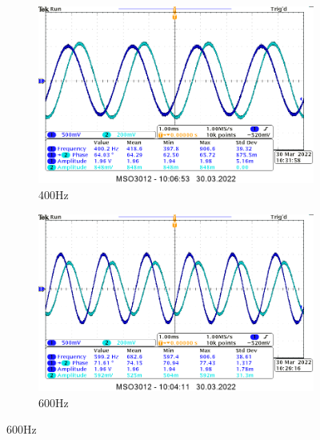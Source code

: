 {\begin{figure}[H]
    \centering
    \begin{subfigure}[h]{0.4\textwidth}
        \includegraphics[width=\textwidth]{img_osciloscope/RC/RC_400Hz_cropped.png}
        \caption*{400Hz}
    \end{subfigure}
    \begin{subfigure}[h]{0.4\textwidth}
        \includegraphics[width=\textwidth]{img_osciloscope/RC/RC_600Hz_cropped.png}
        \caption*{600Hz}
    \end{subfigure}
\end{figure}

}
